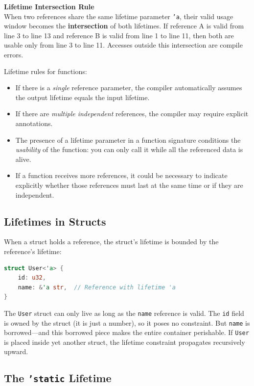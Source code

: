 \begin{exambox}
\textbf{Lifetime Intersection Rule} \\
When two references share the same lifetime parameter \texttt{'a}, their valid usage window becomes the \textbf{intersection} of both lifetimes. If reference A is valid from line 3 to line 13 and reference B is valid from line 1 to line 11, then both are usable only from line 3 to line 11. Accesses outside this intersection are compile errors.
\end{exambox}

Lifetime rules for functions:
\begin{itemize}
    \item If there is a \emph{single} reference parameter, the compiler automatically assumes the output lifetime equals the input lifetime.
    \item If there are \emph{multiple independent} references, the compiler may require explicit annotations.
    \item The presence of a lifetime parameter in a function signature conditions the \emph{usability} of the function: you can only call it while all the referenced data is alive.
    \item If a function receives more references, it could be necessary to indicate explicitly whether those references must last at the same time or if they are independent.
\end{itemize}

\subsection{Lifetimes in Structs}

When a struct holds a reference, the struct's lifetime is bounded by the reference's lifetime:

\begin{lstlisting}[language=Rust]
struct User<'a> {
    id: u32,
    name: &'a str,  // Reference with lifetime 'a
}
\end{lstlisting}

The \texttt{User} struct can only live as long as the \texttt{name} reference is valid. The \texttt{id} field is owned by the struct (it is just a number), so it poses no constraint. But \texttt{name} is borrowed---and this borrowed piece makes the entire container perishable. If \texttt{User} is placed inside yet another struct, the lifetime constraint propagates recursively upward.

\subsection{The \texttt{'static} Lifetime}

